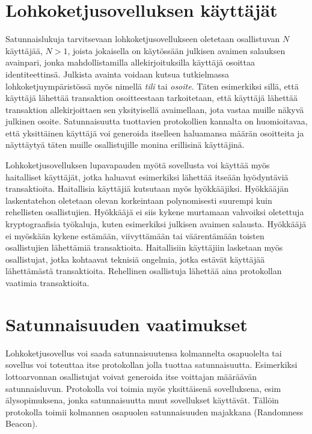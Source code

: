\section{Lohkoketjusovelluksen käyttäjät}

Satunnaislukuja tarvitsevaan lohkoketjusovellukseen oletetaan osallistuvan $N$ käyttäjää, $N > 1$, joista jokaisella on käytössään julkisen avaimen salauksen avainpari, jonka mahdollistamilla allekirjoituksilla käyttäjä osoittaa identiteettinsä. Julkista avainta voidaan kutsua tutkielmassa lohkoketjuympäristössä myös nimellä \textit{tili} tai \textit{osoite}. Täten esimerkiksi sillä, että käyttäjä lähettää transaktion osoitteestaan tarkoitetaan, että käyttäjä lähettää transaktion allekirjoittaen sen yksityisellä avaimellaan, jota vastaa muille näkyvä julkinen osoite.  Satunnaisuutta tuottavien protokollien kannalta on huomioitavaa, että yksittäinen käyttäjä voi generoida itselleen haluamansa määrän osoitteita ja näyttäytyä täten muille osallistujille monina erillisinä käyttäjinä.

Lohkoketjusovelluksen lupavapauden myötä sovellusta voi käyttää myös haitalliset käyttäjät, jotka haluavat esimerkiksi lähettää itseään hyödyntäviä transaktioita. Haitallisia käyttäjiä kutsutaan myös hyökkääjiksi. Hyökkääjän laskentatehon oletetaan olevan korkeintaan polynomisesti suurempi kuin rehellisten osallistujien. Hyökkääjä ei siis kykene murtamaan vahvoiksi oletettuja kryptograafisia työkaluja, kuten esimerkiksi julkisen avaimen salausta. Hyökkääjä ei myöskään kykene estämään, viivyttämään tai väärentämään toisten osallistujien lähettämiä transaktioita. Haitallisiin käyttäjiin lasketaan myös osallistujat, jotka kohtaavat teknisiä ongelmia, jotka estävät käyttäjää lähettämästä transaktioita. Rehellinen osallistuja lähettää aina protokollan vaatimia transaktioita.

\section{Satunnaisuuden vaatimukset}

Lohkoketjusovellus voi saada satunnaisuutensa kolmannelta osapuolelta tai sovellus voi toteuttaa itse protokollan jolla tuottaa satunnaisuutta. Esimerkiksi lottoarvonnan osallistujat voivat generoida itse voittajan määräävän satunnaisluvun. Protokolla voi toimia myös yksittäisenä sovelluksena, esim älysopimuksena, jonka satunnaisuutta muut sovellukset käyttävät. Tällöin protokolla toimii kolmannen osapuolen satunnaisuuden majakkana (Randomness Beacon).

